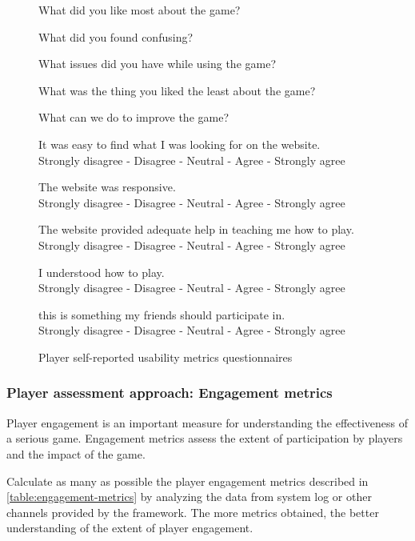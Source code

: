 \documentclass[11pt,oneside]{book}
\begin{document}
\begin{figure}[ht!]
\begin{mybox}
\begin{compactenum}
\item What did you like most about the game?
\item What did you found confusing?
\item What issues did you have while using the game?
\item What was the thing you liked the least about the game?
\item What can we do to improve the game?
\item It was easy to find what I was looking for on the website.  \\
	Strongly disagree  -  Disagree  -  Neutral  -  Agree  -  Strongly agree
\item The website was responsive. \\
	Strongly disagree  -  Disagree  -  Neutral  -  Agree  -  Strongly agree
\item The website provided adequate help in teaching me how to play. \\
	Strongly disagree  -  Disagree  -  Neutral  -  Agree  -  Strongly agree
\item I understood how to play. \\
	Strongly disagree  -  Disagree  -  Neutral  -  Agree  -  Strongly agree
\item this is something my friends should participate in. \\
	Strongly disagree  -  Disagree  -  Neutral  -  Agree  -  Strongly agree
\end{compactenum}
\end{mybox}
\caption{Player self-reported usability metrics questionnaires}
\label{fig:usability-metrics}  
\end{figure}


\subsubsection{Player assessment approach: Engagement metrics}
\label{Engagement metrics}

Player engagement is an important measure for understanding the effectiveness of a serious game.
Engagement metrics assess the extent of participation by players and the impact of the game. 

Calculate as many as possible the player engagement metrics described in \autoref{table:engagement-metrics} by analyzing the data from system log or other channels provided by the framework. The more metrics obtained, the better understanding of the extent of player engagement.
\end{document}
